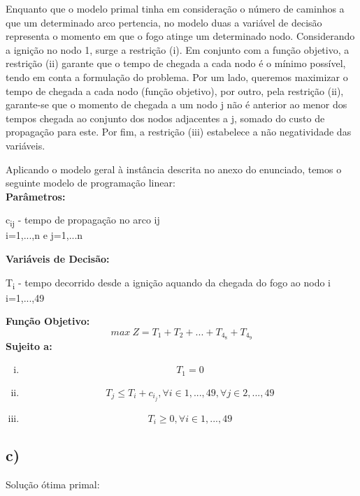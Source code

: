 \documentclass[11pt]{article} %
\begin{document}
Enquanto que o modelo primal tinha em consideração o número de caminhos a que um determinado arco pertencia, no modelo duas a variável de decisão representa o momento em que o fogo atinge um determinado nodo. Considerando a ignição no nodo 1, surge a restrição (i). Em conjunto com a função objetivo, a restrição (ii) garante que o tempo de chegada a cada nodo é o mínimo possível, tendo em conta a formulação do problema. Por um lado, queremos maximizar o tempo de chegada a cada nodo (função objetivo), por outro, pela restrição (ii), garante-se que o momento de chegada a um nodo j não é anterior ao menor dos tempos chegada ao conjunto dos nodos adjacentes a j, somado do custo de propagação para este. Por fim, a restrição (iii) estabelece a não negatividade das variáveis.

Aplicando o modelo geral à instância descrita no anexo do enunciado, temos o seguinte modelo de programação linear: \\
\textbf{Parâmetros:}  \\

\begin{center}
c\textsubscript{ij} - tempo de propagação no arco ij\\
i=1,...,n e j=1,...n \\
\end{center}
\textbf{Variáveis de Decisão:} \\
\begin{center}
T\textsubscript{i} - tempo decorrido desde a ignição aquando da chegada do fogo ao nodo i\\
i=1,...,49\\
\end{center}
\textbf{Função Objetivo:} \\
$$max \ Z = T_1+T_2+...+T_4_8+T_4_9$$
\textbf{Sujeito a:}
\begin{enumerate}[(i)]
\item $$T_1 = 0$$
\item $$T_j \leq T_i + c_i_j, \forall i \in 1,...,49 , \forall j \in 2,...,49$$
\item $$T_i \geq 0, \forall i \in 1,...,49$$
\end{enumerate}


\newpage

\subsection*{c)}
Solução ótima primal:
\end{document}
